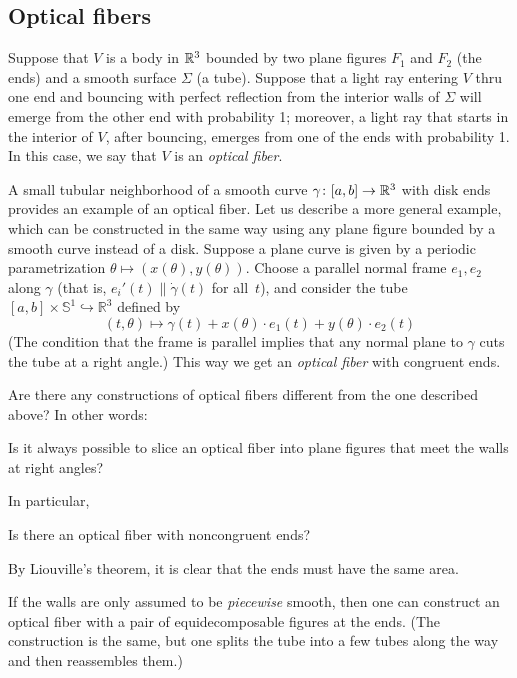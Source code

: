 \subsection{Optical fibers}

Suppose that $V$ is a body in $\mathbb{R}^3$ bounded by two plane figures $F_1$ and $F_2$ (the ends) and a smooth surface $\Sigma$ (a tube).
Suppose that a light ray entering $V$ thru one end and bouncing with perfect reflection from the interior walls of $\Sigma$ will emerge from the other end with probability 1;
moreover, a light ray that starts in the interior of $V$, after bouncing, emerges from one of the ends with  probability 1.
In this case, we say that $V$ is an \emph{optical fiber}.

A small tubular neighborhood of a smooth curve $\gamma\colon[a,b]\to \mathbb{R}^3$ with disk ends provides an example of an optical fiber.
Let us describe a more general example, which can be constructed in the same way using any plane figure bounded by a smooth curve instead of a disk.
Suppose a plane curve is given by a periodic parametrization $\theta\mapsto (x(\theta),y(\theta))$.
Choose a  parallel normal frame $e_1,e_2$ along $\gamma$
(that is, $e_i'(t)\parallel\dot\gamma(t)$ for all~$t$),
and consider the tube $[a,b]\times\mathbb S^1\hookrightarrow\mathbb R^3$ defined by
$$(t,\theta)\mapsto \gamma(t)+x(\theta){\cdot}e_1(t)+y(\theta){\cdot}e_2(t)$$
(The condition that the frame is parallel implies that any normal plane to $\gamma$ cuts the tube at a right angle.)
This way we get an \emph{optical fiber} with congruent ends.

Are there any constructions of optical fibers different from the one described above? In other words:

\begin{pr}
Is it always possible to slice an optical fiber into plane figures that meet the walls at right angles?
\end{pr}

In particular, 

\begin{pr}
Is there an optical fiber with noncongruent ends?
\end{pr}

By  Liouville's theorem, it is clear that the ends must have the same area.

If the walls are only assumed to be \emph{piecewise} smooth, then one can construct an optical fiber with a pair of equidecomposable figures at the ends.
(The construction is the same, but one splits the tube into a few tubes along the way and then reassembles them.)

